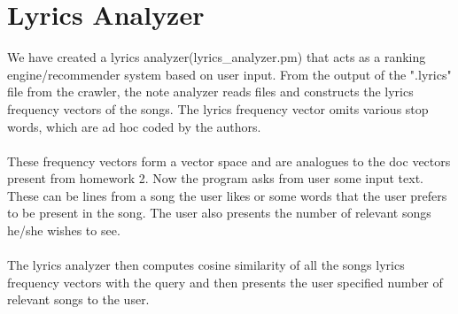 \documentclass[letterpaper, 11pt]{article}
\begin{document}
\section*{Lyrics Analyzer}
We have created a lyrics analyzer(lyrics\_analyzer.pm) that acts as a ranking engine/recommender system based on user input. From the output of the ".lyrics" file from the crawler, the note analyzer reads files and constructs the lyrics frequency vectors of the songs. The lyrics frequency vector omits various stop words, which are ad hoc coded by the authors. \\\\
These frequency vectors form a vector space and are analogues to the doc vectors present from homework 2. Now the program asks from user some input text. These can be lines from a song the user likes or some words that the user prefers to be present in the song. The user also presents the number of relevant songs he/she wishes to see. \\\\
The lyrics analyzer then computes cosine similarity of all the songs lyrics frequency vectors with the query and then presents the user specified number of relevant songs to the user. 
\end{document}
